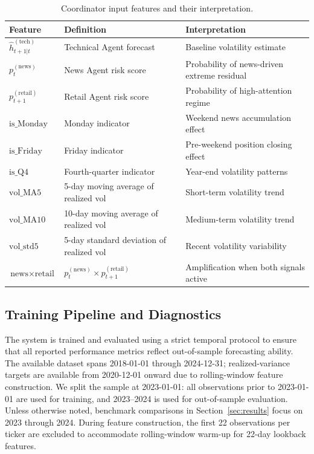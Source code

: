 \documentclass[review]{elsarticle}
\begin{document}
\begin{table}[t]
\centering
\caption{Coordinator input features and their interpretation.}
\label{tab:coordinator-features}
\begin{tabular}{lll}
\hline
Feature & Definition & Interpretation \\ \hline
$\widehat{h}_{t+1|t}^{(\text{tech})}$ & Technical Agent forecast & Baseline volatility estimate \\
$p_{t}^{(\text{news})}$ & News Agent risk score & Probability of news-driven extreme residual \\
$p_{t+1}^{(\text{retail})}$ & Retail Agent risk score & Probability of high-attention regime \\
$\text{is\_Monday}$ & Monday indicator & Weekend news accumulation effect \\
$\text{is\_Friday}$ & Friday indicator & Pre-weekend position closing effect \\
$\text{is\_Q4}$ & Fourth-quarter indicator & Year-end volatility patterns \\
$\text{vol\_MA5}$ & 5-day moving average of realized vol & Short-term volatility trend \\
$\text{vol\_MA10}$ & 10-day moving average of realized vol & Medium-term volatility trend \\
$\text{vol\_std5}$ & 5-day standard deviation of realized vol & Recent volatility variability \\
$\text{news} \times \text{retail}$ & $p_{t}^{(\text{news})} \times p_{t+1}^{(\text{retail})}$ & Amplification when both signals active \\
\hline
\end{tabular}
\end{table}

\subsection{Training Pipeline and Diagnostics}\label{training-pipeline}

The system is trained and evaluated using a strict temporal protocol to ensure that all reported performance metrics reflect out-of-sample forecasting ability. The available dataset spans 2018-01-01 through 2024-12-31; realized-variance targets are available from 2020-12-01 onward due to rolling-window feature construction. %
We split the sample at 2023-01-01: all observations prior to 2023-01-01 are used for training, and 2023--2024 is used for out-of-sample evaluation. %
Unless otherwise noted, benchmark comparisons in Section~\ref{sec:results} focus on 2023 through 2024. During feature construction, the first 22 observations per ticker are excluded to accommodate rolling-window warm-up for 22-day lookback features. %
\end{document}

